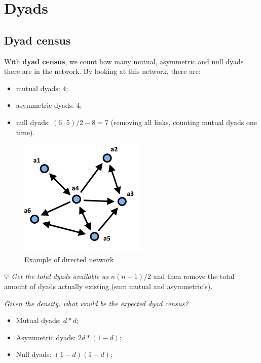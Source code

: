 \documentclass[
  notitlepage,
  onecolumn,
  openany]{book}
\providecommand{\tightlist}{%
  \setlength{\itemsep}{0pt}\setlength{\parskip}{0pt}}
\begin{document}
\hypertarget{dyads}{%
\section{Dyads}\label{dyads}}

\hypertarget{dyad-census}{%
\subsection{Dyad census}\label{dyad-census}}

With \textbf{dyad census}, we count how many mutual, asymmetric and null dyads there are in the network. By looking at this network, there are:

\begin{itemize}
\tightlist
\item
  mutual dyads: \(4\);
\item
  asymmetric dyads: \(4\);
\item
  null dyads: \((6\cdot 5)/2 - 8 = 7\) (removing all links, counting mutual dyads one time).
\end{itemize}

\begin{figure}[h!]

{\centering \includegraphics[width=0.5\linewidth]{images/12-Reciprocity and transitivity/Untitled} 

}

\caption{Example of directed network}\label{fig:unnamed-chunk-92}
\end{figure}

💡 \emph{Get the total dyads available as} \(n(n-1)/2\) and then remove the total amount of dyads actually existing (sum mutual and asymmetric's).

\emph{Given the density, what would be the expected dyad census?}

\begin{itemize}
\tightlist
\item
  Mutual dyads: \(d*d\);
\item
  Asymmetric dyads: \(2d*(1-d)\);
\item
  Null dyads: \((1-d)(1-d)\);
\end{itemize}
\end{document}
